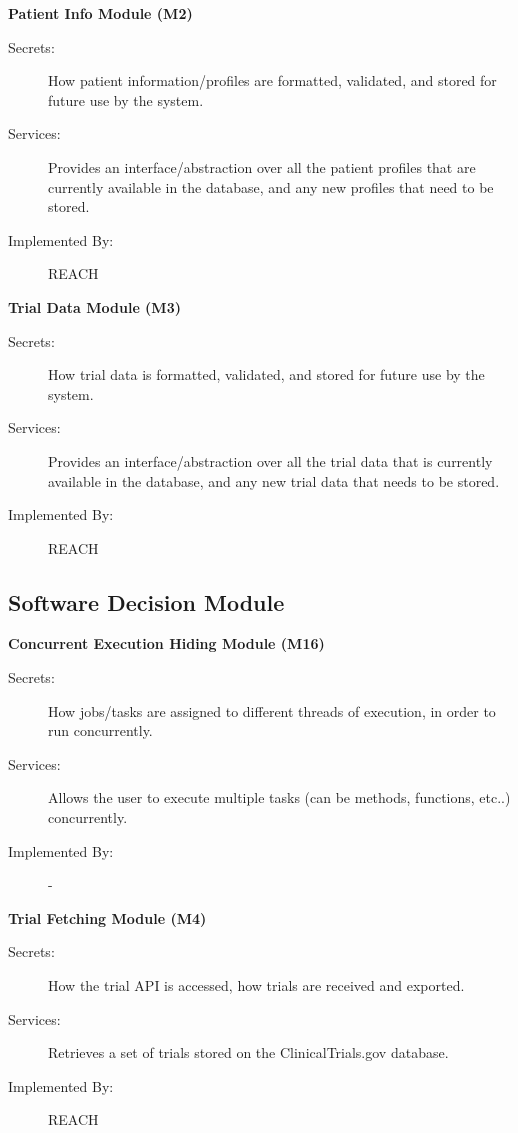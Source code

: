 \documentclass[12pt, titlepage]{article}
\begin{document}
\noindent \textbf{Patient Info Module (M2)}
\begin{description}
  \item[Secrets:] How patient information/profiles are formatted, validated, and stored for future use by the system.
  \item[Services:] Provides an interface/abstraction over all the patient profiles that are currently available in the database, and any new profiles that need to be stored.
  \item[Implemented By:] REACH\\
\end{description}

\noindent \textbf{Trial Data Module (M3)}
\begin{description}
  \item[Secrets:] How trial data is formatted, validated, and stored for future use by the system.
  \item[Services:] Provides an interface/abstraction over all the trial data that is currently available in the database, and any new trial data that needs to be stored.
  \item[Implemented By:] REACH\\
\end{description}

\subsection{Software Decision Module}

\noindent \textbf{Concurrent Execution Hiding Module (M16)}
\begin{description}
  \item[Secrets:] How jobs/tasks are assigned to different threads of execution, in order to run concurrently.
  \item[Services:] Allows the user to execute multiple tasks (can be methods, functions, etc..) concurrently.
  \item[Implemented By:] - \\
\end{description}

\noindent \textbf{Trial Fetching Module (M4)}
\begin{description}
  \item[Secrets:] How the trial API is accessed, how trials are received and exported.
  \item[Services:] Retrieves a set of trials stored on the ClinicalTrials.gov database.
  \item[Implemented By:] REACH \\
\end{description}
\end{document}
